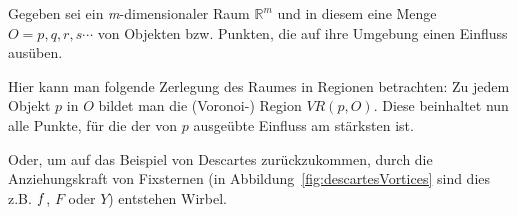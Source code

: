 Gegeben sei ein \textit{m}-dimensionaler Raum $\mathbb{R}^m$ und in diesem eine Menge $O = {p, q, r, s \cdots}$ von Objekten bzw. Punkten, die auf ihre Umgebung einen Einfluss ausüben.

Hier kann man folgende Zerlegung des Raumes in Regionen betrachten: Zu jedem Objekt $p$ in $O$ bildet man die (Voronoi-) Region $VR(p, O)$. Diese beinhaltet nun alle Punkte, für die der von $p$ ausgeübte Einfluss am stärksten ist.

Oder, um auf das Beispiel von Descartes zurückzukommen, durch die Anziehungskraft von Fixsternen (in Abbildung~\ref{fig:descartesVortices} sind dies z.B. $\mathnormal{f}$, $F$ oder $Y$) entstehen Wirbel. \parencite{klein2005algorithmischegeometrie}
